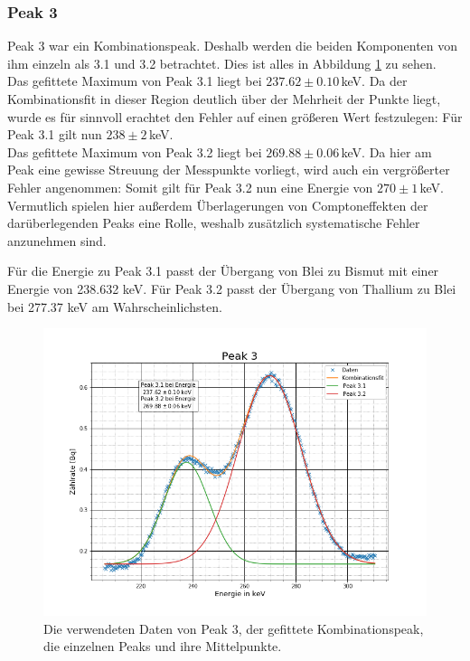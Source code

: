 \subsubsection{Peak 3}
Peak 3 war ein Kombinationspeak. Deshalb werden die beiden Komponenten von ihm einzeln als 3.1 und 3.2 betrachtet. Dies ist alles in Abbildung \ref{p3} zu sehen.\\
Das gefittete Maximum von Peak 3.1 liegt bei $237.62\pm0.10\,$keV. Da der Kombinationsfit in dieser Region deutlich über der Mehrheit der Punkte liegt, wurde es für sinnvoll erachtet den Fehler auf einen größeren Wert festzulegen: Für Peak 3.1 gilt nun $238\pm2\,$keV.\\
Das gefittete Maximum von Peak 3.2 liegt bei $269.88\pm0.06\,$keV. Da hier am Peak eine gewisse Streuung der Messpunkte vorliegt, wird auch ein vergrößerter Fehler angenommen: Somit gilt für Peak 3.2 nun eine Energie von
$270\pm1\,$keV. Vermutlich spielen hier außerdem Überlagerungen von Comptoneffekten der darüberlegenden Peaks eine Rolle, weshalb zusätzlich systematische Fehler anzunehmen sind. \cite{staatsex_szinti} \par
Für die Energie zu Peak 3.1 passt der Übergang von Blei zu Bismut \cite{Blei} mit einer Energie von 238.632 keV. Für Peak 3.2 passt der Übergang von Thallium zu Blei bei 277.37 keV \cite{Thallium} am Wahrscheinlichsten. 


\begin{figure}[h]
	\centering
	\includegraphics[scale=0.7]{Bilder/Anhang/P3}
	\caption[Thorium Peak 3]{\small Die verwendeten Daten von Peak 3, der gefittete Kombinationspeak, die einzelnen Peaks und ihre Mittelpunkte.}
	\label{p3}
\end{figure}


